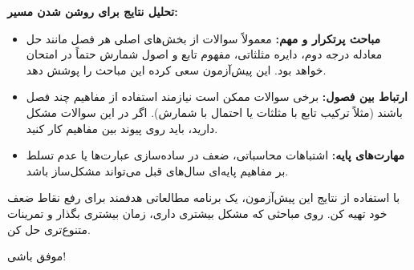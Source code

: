 \documentclass[12pt,a4paper]{article}
\begin{document}
\vspace{1em}
\noindent
\textbf{تحلیل نتایج برای روشن شدن مسیر:}

\begin{itemize}[rightmargin=1em, itemsep=0.5em]
    \item \textbf{مباحث پرتکرار و مهم:} معمولاً سوالات از بخش‌های اصلی هر فصل مانند حل معادله درجه دوم، دایره مثلثاتی، مفهوم تابع و اصول شمارش حتماً در امتحان خواهد بود. این پیش‌آزمون سعی کرده این مباحث را پوشش دهد.
    \item \textbf{ارتباط بین فصول:} برخی سوالات ممکن است نیازمند استفاده از مفاهیم چند فصل باشند (مثلاً ترکیب تابع با مثلثات یا احتمال با شمارش). اگر در این سوالات مشکل دارید، باید روی پیوند بین مفاهیم کار کنید.
    \item \textbf{مهارت‌های پایه:} اشتباهات محاسباتی، ضعف در ساده‌سازی عبارت‌ها یا عدم تسلط بر مفاهیم پایه‌ای سال‌های قبل می‌تواند مشکل‌ساز باشد.
\end{itemize}

\vspace{1em}
\noindent
با استفاده از نتایج این پیش‌آزمون، یک برنامه مطالعاتی هدفمند برای رفع نقاط ضعف خود تهیه کن. روی مباحثی که مشکل بیشتری داری، زمان بیشتری بگذار و تمرینات متنوع‌تری حل کن.

\vspace{1em}
\begin{center}
    موفق باشی!
\end{center}
\end{document}
